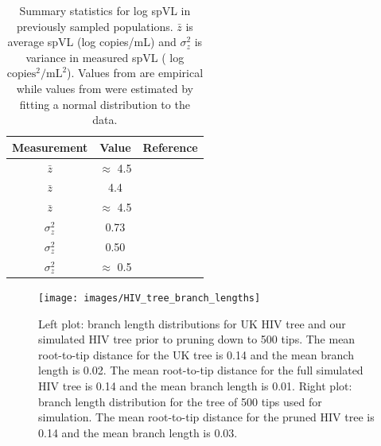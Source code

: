\documentclass[]{article}
\begin{document}
\begin{doublespace}
\begin{table}[H]
	\begin{center}
			\begin{tabular}{ccl} \toprule 
			Measurement & Value & Reference \\ \midrule 
			$\bar{z}$ & $\approx$ 4.5 & \citealt{Mitov2018} \\
			$\bar{z}$ &  4.4 & \citealt{Blanquart2017} \\
			$\bar{z}$ & $\approx$ 4.5 & \citealt{Bonhoeffer2015} \\
			$\sigma^2_z$ &  0.73 &  \citealt{Mitov2018} \\
			$\sigma^2_z$ &  0.50 & \citealt{Blanquart2017} \\
			$\sigma^2_z$ & $\approx$ 0.5 & \citealt{Bonhoeffer2015} \\ \bottomrule 
		\end{tabular}
		\caption{Summary statistics for log spVL in previously sampled populations. $\bar{z}$ is average spVL (log copies/mL) and $\sigma^2_z$ is variance in measured spVL ( log $\textrm{copies}^2/\textrm{mL}^2$). Values from \protect\citet{Blanquart2017, Mitov2018} are empirical while values from \protect\cite{Bonhoeffer2015} were estimated by fitting a normal distribution to the data.}
		\label{tab:spVLmeasurements}
	\end{center}
\end{table}

\begin{figure}[H]
	\texttt{[image: images/HIV\_tree\_branch\_lengths]}
	\caption{Left plot: branch length distributions for UK HIV tree and our simulated HIV tree prior to pruning down to 500 tips. The mean root-to-tip distance for the UK tree is 0.14 and the mean branch length is 0.02. The mean root-to-tip distance for the full simulated HIV tree is 0.14 and the mean branch length is 0.01. Right plot: branch length distribution for the tree of 500 tips used for simulation. The mean root-to-tip distance for the pruned HIV tree is 0.14 and the mean branch length is 0.03.}
	\label{fig:branchlengths}
\end{figure}

\end{doublespace}

\typeout{}
\printbibliography
\end{document}
